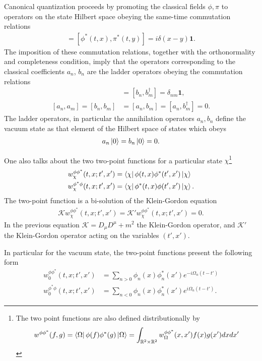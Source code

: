 Canonical quantization proceeds by promoting the classical fields $\phi, \pi$ to operators on the state Hilbert space obeying the same-time commutation relations 
\begin{align}
	[\phi(t, x), \pi(t, y)] = 
	[\phi^*(t, x), \pi^*(t, y)] = i \delta(x-y)\mathbf{1}.
\end{align}
The imposition of these commutation relations, together with the orthonormality and completeness condition, imply that the operators corresponding to the classical coefficients $a_n$, $b_n$ are the ladder operators obeying the commutation relations
\begin{align}
	[a_n, a_m^\dagger] &= [b_n, b_m^\dagger]= \delta_{nm}\mathbf{1}, \\
	[a_n, a_m] = [b_n, b_m]&= 
	[a_n, b_m] = [a_n, b^\dagger_m]=  0.
\end{align}
The ladder operators, in particular the annihilation operators $a_n, b_n $ define the vacuum state as that element of the Hilbert space of states which obeys 
\begin{align}
	a_n \ket{0} = b_n \ket{0} = 0.
\end{align}

One also talks about the two two-point functions for a particular state $\chi$\footnote{The two point functions are also defined distributionally by 
\begin{align*}
	w^{\phi \phi^*}(f, g) = \bra{\Omega} \phi(f)\phi^*(g) \ket{\Omega} = \int_{\mathbb{R}^2\times \mathbb{R}^2}^{}  w^{\phi\phi^*}_\Omega(x, x') f(x) g(x')dx dx'
\end{align*}}
\begin{align}
	w_\chi^{\phi \phi^*}(t, x; t', x') &= \bra{\chi} \phi(t, x) \phi^*(t', x') \ket{\chi}  \\
	w_\chi^{\phi^* \phi}(t, x; t', x') &= \bra{\chi} \phi^*(t, x) \phi(t', x') \ket{\chi}.
\end{align}
The two-point function is a bi-solution of the Klein-Gordon equation
\begin{align}
	\mathcal{K}w_\chi^{\phi \phi^*}(t, x; t', x')  
	= \mathcal{K'} w_\chi^{\phi \phi^*}(t, x; t', x')   = 0.
\end{align}
In the previous equation $\mathcal{K} = D_\mu D^{\mu} + m^2$ the Klein-Gordon operator, and $\mathcal{K'}$ the Klein-Gordon operator acting on the variables $(t', x')$.

In particular for the vacuum state, the two-point functions present the following form
\begin{align}
	w_0^{\phi \phi^*}(t, x; t', x') &= \sum_{n>0}^{}  \phi_n(x)\phi_n^*(x') e^{-i\Omega_n(t-t')} \\
		w_0^{\phi^*\phi }(t, x; t', x') &= \sum_{n<0}^{}  \phi_n(x)\phi_n^*(x') e^{i\Omega_n(t-t')}.
        \label{eq:two-point-function}
\end{align}


